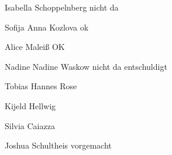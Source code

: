 
\newtoggle{ba-linguistik}\toggletrue{ba-linguistik}























%

%
%





%















Isabella Schoppelnberg nicht da


Sofija Anna Kozlova ok

Alice Maleiß OK

Nadine Nadine Waskow nicht da  entschuldigt


Tobias Hannes Rose 

Kijeld Hellwig





Silvia Caiazza

Joshua Schultheis vorgemacht


